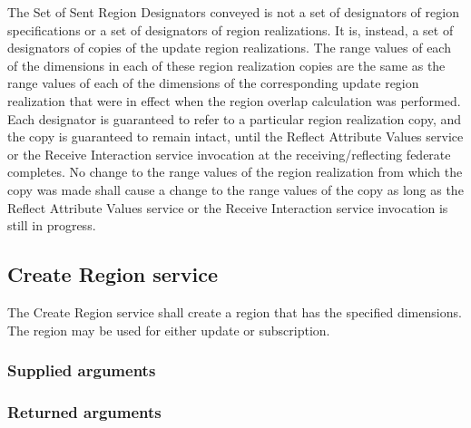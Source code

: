 \begin{compactstdpage}
    The Set of Sent Region Designators conveyed is not a set of designators of region specifications or a set of designators of region realizations. It is, instead, a set of designators of copies of the update region realizations. The range values of each of the dimensions in each of these region realization copies are the same as the range values of each of the dimensions of the corresponding update region realization that were in effect when the region overlap calculation was performed. Each designator is guaranteed to refer to a particular region realization copy, and the copy is guaranteed to remain intact, until the Reflect Attribute Values \rtiinitiated{} service or the Receive Interaction \rtiinitiated{} service invocation at the receiving/reflecting federate completes. No change to the range values of the region realization from which the copy was made shall cause a change to the range values of the copy as long as the Reflect Attribute Values \rtiinitiated{} service or the Receive Interaction \rtiinitiated{} service invocation is still in progress.

    \subsection{Create Region service}

    The Create Region service shall create a region that has the specified dimensions. The region may be used for either update or subscription.

    \subsubsection{Supplied arguments}


    \subsubsection{Returned arguments}


\end{compactstdpage}

\clearpage

